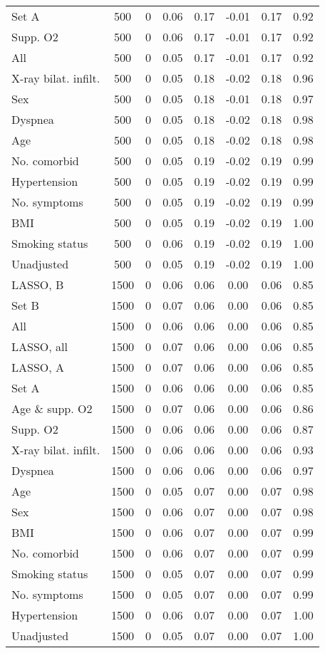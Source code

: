 \documentclass{article}
\begin{document}
\begin{table}[htpb]
{\begin{tabular}{lccccccc}
Set A & 500 & 0 & 0.06 & 0.17 & -0.01 & 0.17 & 0.92\\
Supp. O2 & 500 & 0 & 0.06 & 0.17 & -0.01 & 0.17 & 0.92\\
All & 500 & 0 & 0.05 & 0.17 & -0.01 & 0.17 & 0.92\\
X-ray bilat. infilt. & 500 & 0 & 0.05 & 0.18 & -0.02 & 0.18 & 0.96\\
Sex & 500 & 0 & 0.05 & 0.18 & -0.01 & 0.18 & 0.97\\
Dyspnea & 500 & 0 & 0.05 & 0.18 & -0.02 & 0.18 & 0.98\\
Age & 500 & 0 & 0.05 & 0.18 & -0.02 & 0.18 & 0.98\\
No. comorbid & 500 & 0 & 0.05 & 0.19 & -0.02 & 0.19 & 0.99\\
Hypertension & 500 & 0 & 0.05 & 0.19 & -0.02 & 0.19 & 0.99\\
No. symptoms & 500 & 0 & 0.05 & 0.19 & -0.02 & 0.19 & 0.99\\
BMI & 500 & 0 & 0.05 & 0.19 & -0.02 & 0.19 & 1.00\\
Smoking status & 500 & 0 & 0.06 & 0.19 & -0.02 & 0.19 & 1.00\\
Unadjusted & 500 & 0 & 0.05 & 0.19 & -0.02 & 0.19 & 1.00\\ \midrule
LASSO, B & 1500 & 0 & 0.06 & 0.06 & 0.00 & 0.06 & 0.85\\
Set B & 1500 & 0 & 0.07 & 0.06 & 0.00 & 0.06 & 0.85\\
All & 1500 & 0 & 0.06 & 0.06 & 0.00 & 0.06 & 0.85\\
LASSO, all & 1500 & 0 & 0.07 & 0.06 & 0.00 & 0.06 & 0.85\\
LASSO, A & 1500 & 0 & 0.07 & 0.06 & 0.00 & 0.06 & 0.85\\
Set A & 1500 & 0 & 0.06 & 0.06 & 0.00 & 0.06 & 0.85\\
Age \& supp. O2 & 1500 & 0 & 0.07 & 0.06 & 0.00 & 0.06 & 0.86\\
Supp. O2 & 1500 & 0 & 0.06 & 0.06 & 0.00 & 0.06 & 0.87\\
X-ray bilat. infilt. & 1500 & 0 & 0.06 & 0.06 & 0.00 & 0.06 & 0.93\\
Dyspnea & 1500 & 0 & 0.06 & 0.06 & 0.00 & 0.06 & 0.97\\
Age & 1500 & 0 & 0.05 & 0.07 & 0.00 & 0.07 & 0.98\\
Sex & 1500 & 0 & 0.06 & 0.07 & 0.00 & 0.07 & 0.98\\
BMI & 1500 & 0 & 0.06 & 0.07 & 0.00 & 0.07 & 0.99\\
No. comorbid & 1500 & 0 & 0.06 & 0.07 & 0.00 & 0.07 & 0.99\\
Smoking status & 1500 & 0 & 0.05 & 0.07 & 0.00 & 0.07 & 0.99\\
No. symptoms & 1500 & 0 & 0.05 & 0.07 & 0.00 & 0.07 & 0.99\\
Hypertension & 1500 & 0 & 0.06 & 0.07 & 0.00 & 0.07 & 1.00\\
Unadjusted & 1500 & 0 & 0.05 & 0.07 & 0.00 & 0.07 & 1.00\\
\bottomrule
\hline
\end{tabular}}
\end{table}
\end{document}
